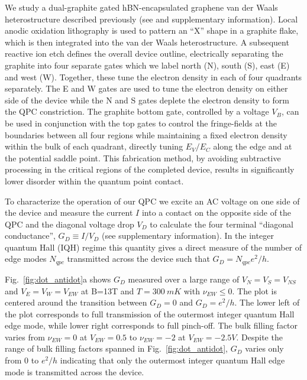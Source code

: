 \documentclass[reprint,prl,aps,superscriptaddress]{revtex4-1}
\begin{document}
We study a  dual-graphite gated hBN-encapsulated graphene van der Waals heterostructure described previously (see \cite{cohen_nanoscale_2023,cohen_universal_2023} and supplementary information). Local anodic oxidation lithography \cite{li_electrode-free_2018} is used to pattern an ``X'' shape in a graphite flake, which is then integrated into the van der Waals heterostructure\cite{cohen_nanoscale_2023}.   
A subsequent reactive ion etch defines the overall device outline, electrically separating the graphite into four separate gates which we label north (N), south (S), east (E) and west (W).  
Together, these tune the electron density in each of four quadrants separately. The E and W gates are used to tune the electron density on either side of the device while the N and S gates deplete the electron density to form the QPC constriction.  The graphite bottom gate, controlled by a voltage $V_{B}$, can be used in conjunction with the top gates to control the fringe-fields at the boundaries between all four regions while maintaining a fixed electron density within the bulk of each quadrant, directly tuning $E_V/E_C$ along the edge and at the potential saddle point. This fabrication method, by avoiding subtractive processing in the critical regions of the completed device, results in significantly lower disorder within the quantum point contact\cite{cohen_nanoscale_2023, cohen_universal_2023}. 

To characterize the operation of our QPC we excite an AC voltage on one side of the device and measure the current $I$ into a contact on the opposite side of the QPC and the diagonal voltage drop $V_D$ to calculate the four terminal ``diagonal conductance'', $G_D \equiv I/V_D$ (see supplementary information). In the integer quantum Hall (IQH) regime this quantity gives a direct measure of the number of edge modes $N_{qpc}$ transmitted across the device such that $G_D = N_{qpc} e^2/h$\cite{datta_electronic_1995, zimmermann_tunable_2017}.

Fig.~\ref{fig:dot_antidot}a shows $G_D$ measured over a large range of $V_N = V_S = V_{NS}$ and $V_E = V_W = V_{EW}$ at B=13T and $T = \SI{300}{mK}$ with $\nu_{EW} \leq 0$.  The plot is centered around the transition between $G_D=0$ and $G_D = e^2/h$. The lower left of the plot corresponds to full transmission of the outermost integer quantum Hall edge mode, while lower right corresponds to full pinch-off.  The bulk filling factor varies from $\nu_{EW} = 0$ at $V_{EW} = 0.5$ to $\nu_{EW} = -2$ at $V_{EW} = -2.5V$.  Despite the range of bulk filling factors spanned in Fig.~\ref{fig:dot_antidot}, $G_D$ varies only from $0$ to $e^2/h$ indicating that only the outermost integer quantum Hall edge mode is transmitted across the device. 
\end{document}
